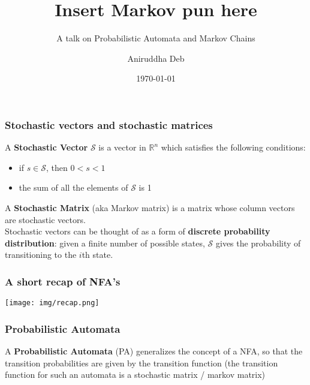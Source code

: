 \documentclass{beamer}
\title{Insert Markov pun here}
\subtitle{A talk on Probabilistic Automata and Markov Chains}
\author{Aniruddha Deb}
\institute{IIT Delhi}
\date{\today}
\begin{document}
\begin{frame}
\titlepage
\end{frame}

\begin{frame}
\frametitle{Stochastic vectors and stochastic matrices}
\pause
A \textbf{Stochastic Vector} $\mathcal{S}$ is a vector in $\mathbb{R}^n$ which satisfies the 
following conditions:
\begin{itemize}
	\item if $s \in \mathcal{S}$, then $0 < s < 1$
	\item the sum of all the elements of $\mathcal{S}$ is 1
\end{itemize}
\vspace{2em}
\pause
A \textbf{Stochastic Matrix} (aka Markov matrix) is a matrix whose column vectors
are stochastic vectors. \\
\vspace{2em}
\pause
Stochastic vectors can be thought of as a form of \textbf{discrete probability distribution}: 
given a finite number of possible states, $\mathcal{S}$ gives the probability 
of transitioning to the $i$th state.
\end{frame}

\begin{frame}
\frametitle{A short recap of NFA's}

\begin{center}
\texttt{[image: img/recap.png]}
\end{center}

\end{frame}

\begin{frame}[fragile]
\frametitle{Probabilistic Automata}
A \textbf{Probabilistic Automata} (PA) generalizes the concept of a NFA, so that
the transition probabilities are given by the transition function (the transition
function for such an automata is a stochastic matrix / markov matrix)
\pause
\begin{center}
\end{center}
\end{frame}
\end{document}
